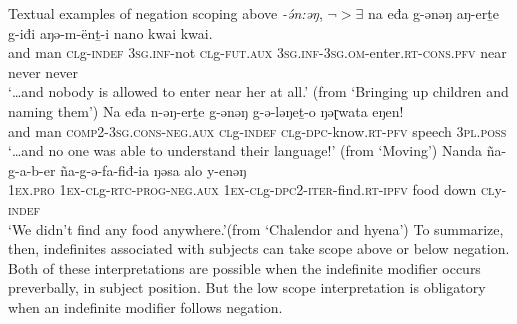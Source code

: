 \ea Textual examples of negation scoping above \textit{-ə́n:əŋ}, $\neg>\exists$   \label{textany} %
\ea \gll  na eđa g-ənəŋ aŋ-erṯe g-iđi aŋə-m-ënṯ-i nano kwai kwai.\\
and man \textsc{cl}g-\textsc{indef} 3\textsc{sg}.\textsc{inf}-not \textsc{cl}g-\textsc{fut.aux} 3\textsc{sg}.\textsc{inf}-3\textsc{sg}.\textsc{om}-enter.\textsc{rt}-\textsc{cons}.\textsc{pfv} near never never\\
\glt  `\ldots and nobody is allowed to enter near her at all.' \hfill (from `Bringing up children and naming them') \label{textanya}
\ex \gll Na eđa n-ǝŋ-erṯe g-ǝnǝŋ g-ǝ-lǝŋeṯ-o ŋǝɽwata eŋen!\\
and man \textsc{comp}2-\textsc{3sg.cons}-\textsc{neg.aux} \textsc{cl}g-\textsc{indef} \textsc{cl}g-\textsc{dpc}-know.\textsc{rt}-\textsc{pfv} speech 3\textsc{pl}.\textsc{poss}\\
\glt `\ldots and no one was able to understand their language!' \hfill (from `Moving') \label{textanyb}
\ex \gll Nanda ña-g-a-b-er ña-g-ǝ-fa-fiđ-ia ŋǝsa alo y-enǝŋ\\
1\textsc{ex.pro} 1\textsc{ex}-\textsc{cl}g-\textsc{rtc}-\textsc{prog}-\textsc{neg.aux} 1\textsc{ex}-\textsc{cl}g-\textsc{dpc}2-\textsc{iter}-find.\textsc{rt}-\textsc{ipfv} food down \textsc{cl}y-\textsc{indef}\\
\glt `We didn’t find any food anywhere.'\hfill (from `Chalendor and hyena') \label{textanyc}
\z
\z 
To summarize, then, indefinites associated with subjects can take scope above or below negation. Both of these interpretations are possible when the indefinite modifier occurs preverbally, in subject position. But the low scope interpretation is obligatory when an indefinite modifier follows negation. 

